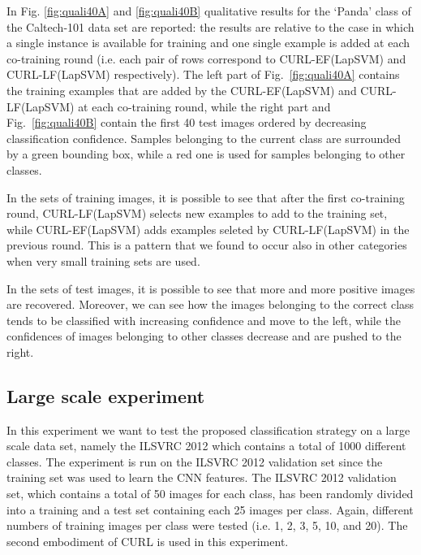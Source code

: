 \documentclass[journal,11pt]{IEEEtran}
\newcommand{\coso}{strategy}
\newcommand{\emb}{embodiment}
\newcommand{\curllaplf}{CURL-LF(LapSVM)}
\newcommand{\curllapef}{CURL-EF(LapSVM)}
\begin{document}
In Fig. \ref{fig:quali40A} and \ref{fig:quali40B} %
qualitative results for the `Panda' class of the Caltech-101 data set are reported: the results are relative to the case in which a single instance is available for training and one single example is added at each co-training round (i.e. each pair of rows correspond to \curllapef{ }and \curllaplf{ }respectively). The left part of Fig.~\ref{fig:quali40A} contains the training examples that are added by the \curllapef{ }and \curllaplf{ }at each co-training round, while the right part and Fig.~\ref{fig:quali40B} contain the first 40 test images ordered by decreasing classification confidence. Samples belonging to the current class are surrounded by a green bounding box, while a red one is used for samples belonging to other classes.

In the sets of training images, it is possible to see that after the first co-training round, \curllaplf{ }selects new examples to add to the training set, while \curllapef{ }adds examples seleted by \curllaplf{ }in the previous round. This is a pattern that we found to occur also in other categories when very small training sets are used. 

In the sets of test images, it is possible to see that more and more positive images are recovered. Moreover, we can see how the images belonging to the correct class tends to be classified with increasing confidence and move to the left, while the confidences of images belonging to other classes decrease and are pushed to the right. 



\subsection{Large scale experiment}	
\label{subsec:ilvsrc}

In this experiment we want to test the proposed classification \coso{ }on a large scale data set, namely the ILSVRC 2012 which contains a total of 1000 different classes. The experiment is run on the ILSVRC 2012 validation set since the training set was used to learn the CNN features. The ILSVRC 2012 validation set, which contains a total of 50 images for each class, has been randomly divided into a training and a test set containing each 25 images per class. Again, different numbers of training images per class were tested (i.e. 1, 2, 3, 5, 10, and 20). The second \emb{ } of CURL is used in this experiment. 
\end{document}
